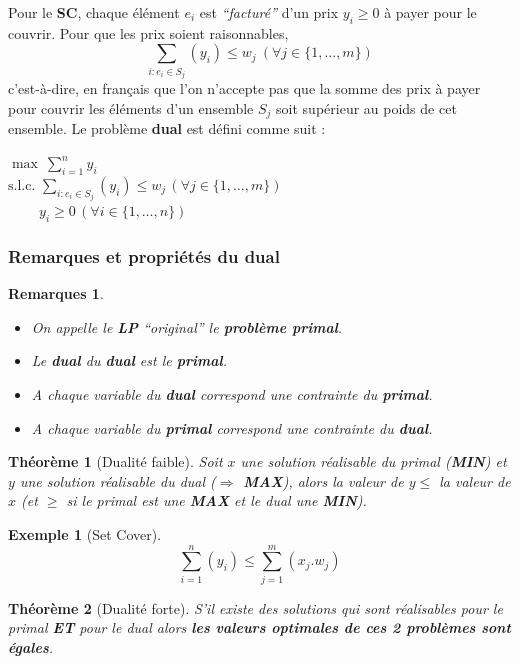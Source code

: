 \documentclass{article}
\newcommand{\titre}[1]{\textcolor{title}{#1}}
\newtheorem{exemple}{Exemple}[section]
\newtheorem{rems}{Remarques}[section]
\newtheorem{thm}{Th\'eor\`eme}[section]
\begin{document}
\begin{sffamily}
Pour le \textbf{\titre{SC}}, chaque élément $e_i$ est \textit{``facturé''} d'un prix $y_i \geq 0$ à payer pour le couvrir. Pour que les
prix soient raisonnables,
$$\sum_{i:e_i\in S_j} (y_i) \leq w_j\ (\forall j \in \{1,...,m\})$$
c'est-à-dire, en français que l'on n'accepte pas que la somme des prix à payer pour couvrir les éléments d'un ensemble $S_j$ soit
supérieur au poids de cet ensemble. Le problème \textbf{dual} est défini comme suit :

$\max\ \sum_{i=1}^n y_i$ \\
\indent $\text{s.l.c. } \sum_{i:e_i \in S_j}(y_i) \leq w_j\, (\forall j \in \{1,\ldots ,m\})$ \\
\indent $\qquad\ y_i \geq 0\, (\forall i \in \{1,\ldots ,n\})$

\subsubsection{Remarques et propriétés du dual}

\begin{rems}
\begin{itemize}
\item On appelle le \textbf{\titre{LP}} ``original'' le \textbf{problème primal}.
\item Le \textbf{dual} du \textbf{dual} est le \textbf{primal}.
\item A chaque variable du \textbf{dual} correspond une contrainte du \textbf{primal}.
\item A chaque variable du \textbf{primal} correspond une contrainte du \textbf{dual}.
\end{itemize}
\end{rems}

\begin{thm}[\titre{Dualité faible}] Soit $x$ une solution réalisable du primal (\textbf{MIN}) et $y$ une solution réalisable du dual
(\textbf{$\Rightarrow$ MAX}), alors la valeur de $y \leq$ la valeur de $x$ (et $\geq$ si le primal est une \textbf{MAX} et le dual
une \textbf{MIN}).
\end{thm}

\begin{exemple}[Set Cover]
$$\sum_{i=1}^n(y_i) \leq \sum^m_{j=1} (x_j.w_j)$$
\end{exemple}

\begin{thm}[\titre{Dualité forte}] S'il existe des solutions qui sont réalisables pour le primal \textbf{ET} pour le dual alors
\textbf{les valeurs optimales de ces 2 problèmes sont égales}.
\end{thm}


\end{sffamily}
\end{document}
